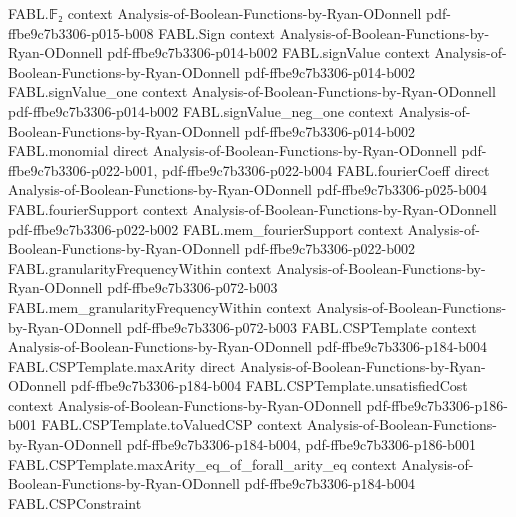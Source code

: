 \begin{theorem}
\label{FABL.expect_e3SatPredicate}
\leanok
{}
\proofstep
  {FABL.𝔽₂}
  {context}
  {Analysis-of-Boolean-Functions-by-Ryan-ODonnell}
  {pdf-ffbe9c7b3306-p015-b008}
\proofstep
  {FABL.Sign}
  {context}
  {Analysis-of-Boolean-Functions-by-Ryan-ODonnell}
  {pdf-ffbe9c7b3306-p014-b002}
\proofstep
  {FABL.signValue}
  {context}
  {Analysis-of-Boolean-Functions-by-Ryan-ODonnell}
  {pdf-ffbe9c7b3306-p014-b002}
\proofstep
  {FABL.signValue_one}
  {context}
  {Analysis-of-Boolean-Functions-by-Ryan-ODonnell}
  {pdf-ffbe9c7b3306-p014-b002}
\proofstep
  {FABL.signValue_neg_one}
  {context}
  {Analysis-of-Boolean-Functions-by-Ryan-ODonnell}
  {pdf-ffbe9c7b3306-p014-b002}
\proofstep
  {FABL.monomial}
  {direct}
  {Analysis-of-Boolean-Functions-by-Ryan-ODonnell}
  {pdf-ffbe9c7b3306-p022-b001,
    pdf-ffbe9c7b3306-p022-b004}
\proofstep
  {FABL.fourierCoeff}
  {direct}
  {Analysis-of-Boolean-Functions-by-Ryan-ODonnell}
  {pdf-ffbe9c7b3306-p025-b004}
\proofstep
  {FABL.fourierSupport}
  {context}
  {Analysis-of-Boolean-Functions-by-Ryan-ODonnell}
  {pdf-ffbe9c7b3306-p022-b002}
\proofstep
  {FABL.mem_fourierSupport}
  {context}
  {Analysis-of-Boolean-Functions-by-Ryan-ODonnell}
  {pdf-ffbe9c7b3306-p022-b002}
\proofstep
  {FABL.granularityFrequencyWithin}
  {context}
  {Analysis-of-Boolean-Functions-by-Ryan-ODonnell}
  {pdf-ffbe9c7b3306-p072-b003}
\proofstep
  {FABL.mem_granularityFrequencyWithin}
  {context}
  {Analysis-of-Boolean-Functions-by-Ryan-ODonnell}
  {pdf-ffbe9c7b3306-p072-b003}
\proofstep
  {FABL.CSPTemplate}
  {context}
  {Analysis-of-Boolean-Functions-by-Ryan-ODonnell}
  {pdf-ffbe9c7b3306-p184-b004}
\proofstep
  {FABL.CSPTemplate.maxArity}
  {direct}
  {Analysis-of-Boolean-Functions-by-Ryan-ODonnell}
  {pdf-ffbe9c7b3306-p184-b004}
\proofstep
  {FABL.CSPTemplate.unsatisfiedCost}
  {context}
  {Analysis-of-Boolean-Functions-by-Ryan-ODonnell}
  {pdf-ffbe9c7b3306-p186-b001}
\proofstep
  {FABL.CSPTemplate.toValuedCSP}
  {context}
  {Analysis-of-Boolean-Functions-by-Ryan-ODonnell}
  {pdf-ffbe9c7b3306-p184-b004,
    pdf-ffbe9c7b3306-p186-b001}
\proofstep
  {FABL.CSPTemplate.maxArity_eq_of_forall_arity_eq}
  {context}
  {Analysis-of-Boolean-Functions-by-Ryan-ODonnell}
  {pdf-ffbe9c7b3306-p184-b004}
\proofstep
  {FABL.CSPConstraint}

\end{theorem}
